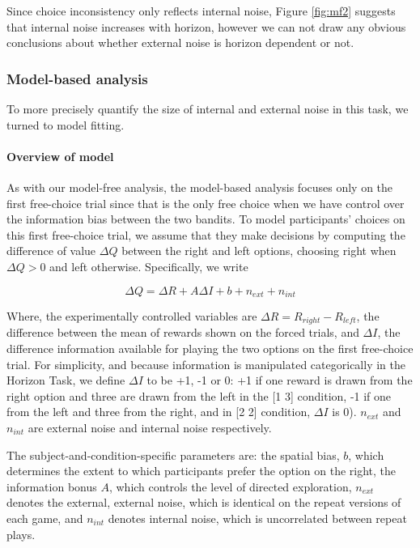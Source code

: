 \documentclass[12pt]{article}
\begin{document}
	Since choice inconsistency only reflects internal noise, Figure \ref{fig:mf2} suggests that internal noise increases with horizon, however we can not draw any obvious conclusions about whether external noise is horizon dependent or not.
	
	\subsubsection*{Model-based analysis}
	To more precisely quantify the size of internal and external noise in this task, we turned to model fitting.
	
	\paragraph{Overview of model}
	As with our model-free analysis, the model-based analysis focuses only on the first free-choice trial since that is the only free choice when we have control over the information bias between the two bandits. To model participants’ choices on this first free-choice trial, we assume that they make decisions by computing the difference of value $\Delta Q$ between the right and left options, choosing right when $\Delta Q > 0$ and left otherwise.  Specifically, we write
	
	
	\begin{equation}
	    \Delta Q= \Delta R+A \Delta    I+b+n_{ext}+n_{int}
	\end{equation}
	
	Where, the experimentally controlled variables are $\Delta R=R_{right}-R_{left}$, the difference between the mean of rewards shown on the forced trials, and $\Delta I$, the difference information available for playing the two options on the first free-choice trial. For simplicity, and because information is manipulated categorically in the Horizon Task, we define $\Delta I$ to be +1, -1 or 0: +1 if one reward is drawn from the right option and three are drawn from the left in the [1 3] condition, -1 if one from the left and three from the right, and in [2 2] condition, $\Delta I$ is 0). $n_{ext}$ and $n_{int}$ are external noise and internal noise respectively.
	
	The subject-and-condition-specific parameters are: the spatial bias, $b$, which determines the extent to which participants prefer the option on the right, the information bonus $A$, which controls the level of directed exploration, $n_{ext}$ denotes the external, external noise, which is identical on the repeat versions of each game, and $n_{int}$ denotes internal noise, which is uncorrelated between repeat plays. 
	
\end{document}
